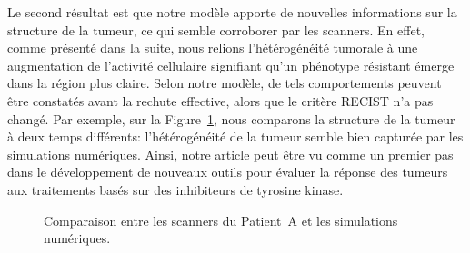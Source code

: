 \documentclass[11pt]{amsart}
\numberwithin{equation}{section}
\newcommand{\Nber}{Patient~A\xspace}
\begin{document}
Le second résultat est que notre modèle apporte de nouvelles informations sur la structure de la tumeur, ce qui semble corroborer par les scanners. En effet, comme présenté dans la suite, nous relions l'hétérogénéité tumorale à une augmentation de l'activité cellulaire signifiant qu'un phénotype résistant émerge dans la région plus claire. Selon notre modèle, de tels comportements peuvent être constatés avant la rechute effective, alors que le critère RECIST n'a pas changé. Par exemple, sur la Figure~\ref{fig:compare_spatial_nber}, 
nous comparons la structure de la tumeur à deux temps différents: l'hétérogénéité de la tumeur semble bien capturée par les simulations numériques. Ainsi, notre article peut être vu comme un premier pas dans le développement de nouveaux outils pour évaluer la réponse des tumeurs aux traitements  basés sur des inhibiteurs de tyrosine kinase.


\begin{figure}[h]
\caption{\label{fig:compare_spatial_nber}
Comparaison entre les scanners du \Nber et les simulations numériques.
}
\end{figure}
\end{document}
